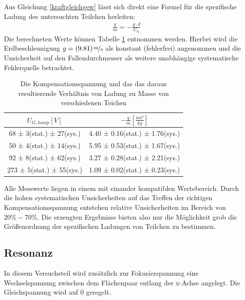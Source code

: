 \documentclass[a4paper,12pt]{article}
\begin{document}
Aus Gleichung \ref{kraftgleichgew} lässt sich direkt eine Formel für die spezifische Ladung des untersuchten Teilchen herleiten:
\begin{align}\label{zspezm}
	\frac{q}{m} = -\frac{g \cdot  d}{U_{G}}
\end{align}
Die berechneten Werte können Tabelle \ref{tab:z-komp-result} entnommen werden. Hierbei wird die Erdbeschleunigung 
$g = \unitfrac[(9.81)]{m}{s}$ als konstant (fehlerfrei) angenommen und die Unsicherheit auf den Fallendurchmesser als weitere
unabhängige systematische Fehlerquelle betrachtet.


\begin{table}[h]
	\centering
	\begin{tabular}{ c | c }
		$U_{G,komp} [V] $ & $-\frac{q}{m}[\frac{mC}{kg}]$ \\
		\hline
		  68 ± 3(stat.) ± 27(sys.) &  4.40 ± 0.16(stat.) ± 1.76(sys.)  \\
		  50 ± 4(stat.) ± 14(sys.) &  5.95 ± 0.53(stat.) ± 1.67(sys.)  \\
		  92 ± 8(stat.) ± 62(sys.) &  3.27 ± 0.28(stat.) ± 2.21(sys.)  \\
		  273 ± 5(stat.) ± 55(sys.) & 1.09 ± 0.02(stat.) ± 0.23(sys.)  \\
	\end{tabular}
	\caption{Die Kompensationsspannung und das das daraus resultierende Verhältnis von Ladung zu Masse von verschiedenen Teichen}
	\label{tab:z-komp-result}
\end{table}


Alle Messwerte liegen in einem mit einander kompatiblen Wertebereich. Durch die hohen systematischen Unsicherheiten auf das
Treffen der richtigen Kompensationsspannung entstehen relative Unsicherheiten im Bereich von $20\% - 70 \%$. Die erzeugten
Ergebnisse bieten also nur die Möglichkeit grob die Größenordnung der spezifischen Ladungen von Teilchen zu bestimmen.

\subsection{Resonanz}
In diesem Versuchsteil wird zusätzlich zur Fokusierspannung eine Wechselspannung zwischen dem Flächenpaar entlang der x-Achse angelegt.
Die Gleichspannung wird auf $0$ geregelt.
\end{document}
